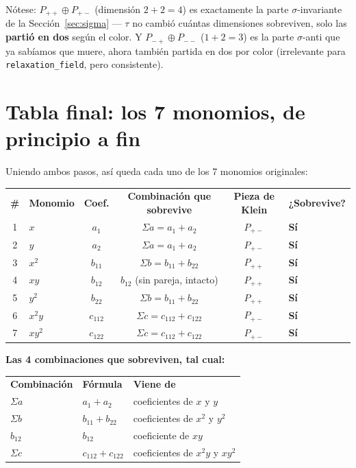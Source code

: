 \documentclass[11pt, a4paper]{article}
\newcommand{\TH}[1]{\cellcolor{cTHbg}\color{white}\textbf{#1}}
\newcommand{\good}[1]{\color{cGood}\textbf{#1}}
\begin{document}
N\'otese: $P_{++}\oplus P_{+-}$ (dimensi\'on $2+2=4$) es exactamente la
parte $\sigma$-invariante de la Secci\'on~\ref{sec:sigma} --- $\tau$ no
cambi\'o cu\'antas dimensiones sobreviven, solo las \textbf{parti\'o en
dos} seg\'un el color. Y $P_{-+}\oplus P_{--}$ ($1+2=3$) es la parte
$\sigma$-anti que ya sab\'iamos que muere, ahora tambi\'en partida en
dos por color (irrelevante para \texttt{relaxation\_field}, pero
consistente).

\section{Tabla final: los 7 monomios, de principio a fin}

Uniendo ambos pasos, as\'i queda cada uno de los 7 monomios
originales:

\medskip
\begin{center}
\begin{tabular}{clcccl}
  \TH{\#} & \TH{Monomio} & \TH{Coef.} & \TH{Combinaci\'on que sobrevive} & \TH{Pieza de Klein} & \TH{¿Sobrevive?} \\[1pt]
  1 & $x$    & $a_1$     & $\Sigma a = a_1{+}a_2$         & $P_{+-}$ & \good{S\'i} \\
  2 & $y$    & $a_2$     & $\Sigma a = a_1{+}a_2$         & $P_{+-}$ & \good{S\'i} \\
  3 & $x^2$  & $b_{11}$  & $\Sigma b = b_{11}{+}b_{22}$   & $P_{++}$ & \good{S\'i} \\
  4 & $xy$   & $b_{12}$  & $b_{12}$ (sin pareja, intacto) & $P_{++}$ & \good{S\'i} \\
  5 & $y^2$  & $b_{22}$  & $\Sigma b = b_{11}{+}b_{22}$   & $P_{++}$ & \good{S\'i} \\
  6 & $x^2y$ & $c_{112}$ & $\Sigma c = c_{112}{+}c_{122}$ & $P_{+-}$ & \good{S\'i} \\
  7 & $xy^2$ & $c_{122}$ & $\Sigma c = c_{112}{+}c_{122}$ & $P_{+-}$ & \good{S\'i} \\
\end{tabular}
\end{center}
\medskip

\begin{tcolorbox}[defbox]
\textbf{Las 4 combinaciones que sobreviven, tal cual:}
\begin{center}
\begin{tabular}{lll}
  \TH{Combinaci\'on} & \TH{F\'ormula} & \TH{Viene de} \\[1pt]
  $\Sigma a$ & $a_1+a_2$       & coeficientes de $x$ y $y$ \\
  $\Sigma b$ & $b_{11}+b_{22}$ & coeficientes de $x^2$ y $y^2$ \\
  $b_{12}$   & $b_{12}$        & coeficiente de $xy$ \\
  $\Sigma c$ & $c_{112}+c_{122}$ & coeficientes de $x^2y$ y $xy^2$ \\
\end{tabular}
\end{center}
\end{tcolorbox}
\end{document}
